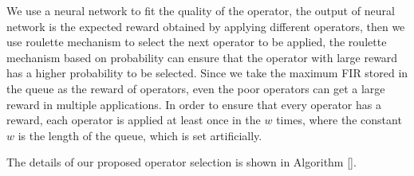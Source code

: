 \documentclass[journal]{IEEEtran}
\begin{document}
We use a neural network to fit the quality of the operator, the output of neural network is the expected reward obtained by applying different operators, then we use roulette mechanism to select the next operator to be applied, the roulette mechanism based on probability can ensure that the operator with large reward has a higher probability to be selected.
Since we take the maximum FIR stored in the queue as the reward of operators, even the poor operators can get a large reward in multiple applications. In order to ensure that every operator has a reward, each operator is applied at least once in the $w$ times, where the constant $w$ is the length of the queue, which is set artificially.

The details of our proposed operator selection is shown in Algorithm \ref{}.
\end{document}
